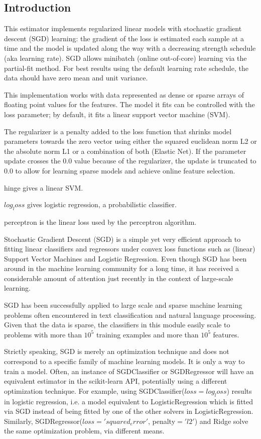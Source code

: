 \documentclass[a4paper,12pt]{article}
\begin{document}
\subsection{Introduction}


This estimator implements regularized linear models with stochastic gradient descent (SGD) learning: the gradient of the loss is estimated each sample at a time and the model is updated along the way with a decreasing strength schedule (aka learning rate).
SGD allows minibatch (online out-of-core) learning via the partial-fit method.
For best results using the default learning rate schedule, the data should have zero mean and unit variance.

This implementation works with data represented as dense or sparse arrays of floating point values for the features.
The model it fits can be controlled with the loss parameter; by default, it fits a linear support vector machine (SVM).

The regularizer is a penalty added to the loss function that shrinks model parameters towards the zero vector using either the squared euclidean norm L2 or the absolute norm L1 or a combination of both (Elastic Net). If the parameter update crosses the 0.0 value because of the regularizer, the update is truncated to 0.0 to allow for learning sparse models and achieve online feature selection.

hinge gives a linear SVM.

$log_loss$ gives logistic regression, a probabilistic classifier.

perceptron is the linear loss used by the perceptron algorithm.

Stochastic Gradient Descent (SGD) is a simple yet very efficient approach to fitting linear classifiers and regressors under convex loss functions such as (linear) Support Vector Machines and Logistic Regression.
Even though SGD has been around in the machine learning community for a long time, it has received a considerable amount of attention just recently in the context of large-scale learning.

SGD has been successfully applied to large scale and sparse machine learning problems often encountered in text classification and natural language processing.
Given that the data is sparse, the classifiers in this module easily scale to problems with more than $10^5$ training examples and more than $10^5$ features.

Strictly speaking, SGD is merely an optimization technique and does not correspond to a specific family of machine learning models.
It is only a way to train a model.
Often, an instance of SGDClassifier or SGDRegressor will have an equivalent estimator in the scikit-learn API, potentially using a different optimization technique.
For example, using SGDClassifier($loss=log_loss$) results in logistic regression, i.e. a model equivalent to LogisticRegression which is fitted via SGD instead of being fitted by one of the other solvers in LogisticRegression.
Similarly, SGDRegressor($loss='squared_error'$, penalty$='l2'$) and Ridge solve the same optimization problem, via different means.
\end{document}
